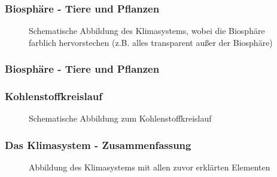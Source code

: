 \begin{frame}
	\frametitle{Biosphäre - Tiere und Pflanzen}
	
	\begin{figure}
		\caption{Schematische Abbildung des Klimasystems, wobei die Biosphäre farblich hervorstechen (z.B. alles transparent außer der Biosphäre)}
	\end{figure}
\end{frame}

\begin{frame}
	\frametitle{Biosphäre - Tiere und Pflanzen}
\end{frame}


\begin{frame}
	\frametitle{Kohlenstoffkreislauf}
	
	
	\begin{figure}
		\caption{Schematische Abbildung zum Kohlenstoffkreislauf}
	\end{figure}
	
\end{frame}


\begin{frame}
	\frametitle{Das Klimasystem - Zusammenfassung}
	
	\begin{figure}
		\caption{Abbildung des Klimasystems mit allen zuvor erklärten Elementen}
	\end{figure}
\end{frame}


%	

